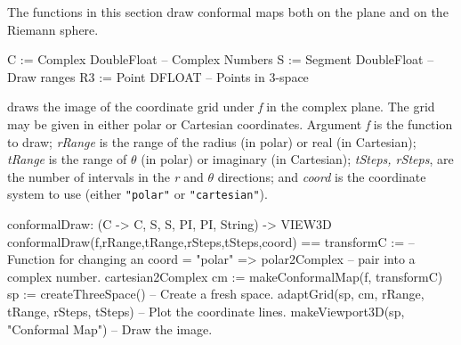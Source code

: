 %
%
The functions in this section draw conformal maps both on the
plane and on the Riemann sphere.

\begin{xmpLinesPlain}
C := Complex DoubleFloat                                 -- Complex Numbers
S := Segment DoubleFloat                                 -- Draw ranges
R3 := Point DFLOAT                                       -- Points in 3-space

\end{xmpLinesPlain}

draws the image of the coordinate grid under {\it f} in the complex plane.
The grid may be given in either polar or Cartesian coordinates.
Argument {\it f} is the function to draw;
{\it rRange} is the range of the radius (in polar) or real (in Cartesian);
{\it tRange} is the range of $\theta$ (in polar) or imaginary (in Cartesian);
{\it tSteps, rSteps}, are the number of intervals in the {\it r} and
$\theta$ directions; and
{\it coord} is the coordinate system to use (either {\tt "polar"} or
{\tt "cartesian"}).

\begin{xmpLinesNoResetPlain}
conformalDraw: (C -> C, S, S, PI, PI, String) -> VIEW3D
conformalDraw(f,rRange,tRange,rSteps,tSteps,coord) ==
  transformC :=                                          -- Function for changing an 
    coord = "polar" => polar2Complex                     -- \quad{}pair into a complex number.
    cartesian2Complex
  cm := makeConformalMap(f, transformC)
  sp := createThreeSpace()                               -- Create a fresh space.
  adaptGrid(sp, cm, rRange, tRange, rSteps, tSteps)      -- Plot the coordinate lines.
  makeViewport3D(sp, "Conformal Map")                    -- Draw the image.
\end{xmpLinesNoResetPlain}

